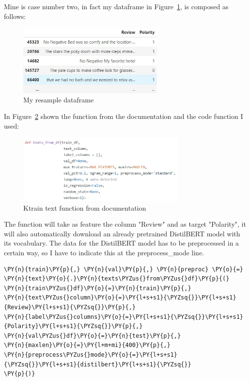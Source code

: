 Mine is case number two, in fact my dataframe in Figure~\ref{fig:fig_24}, is composed as follows:
\begin{figure}[ht!]
\centering
\includegraphics[width=0.65\textwidth]{images/dataframe.jpg}
\caption{My resample dataframe}
\label{fig:fig_24}
\end{figure}
\FloatBarrier

In Figure~\ref{fig:fig_22} shown the function from the documentation and the code function I used:
\begin{figure}[ht!]
\centering
\includegraphics[width=0.75\textwidth]{images/textdf.jpg}
\caption{\gls{Ktrain} text function from documentation}
\label{fig:fig_22}
\end{figure}
\FloatBarrier
The function will take as feature the column "Review" and as target "Polarity", it will also automatically download an already pretrained DistilBERT model with its vocabulary.
The data for the DistilBERT model has to be preprocessed in a certain way, so I have to indicate this at the preprocess\_mode line.
    \begin{tcolorbox}[breakable, size=fbox, boxrule=1pt, pad at break*=1mm,colback=cellbackground, colframe=cellborder]

\begin{Verbatim}[commandchars=\\\{\},fontsize=\footnotesize]
\PY{n}{train}\PY{p}{,} \PY{n}{val}\PY{p}{,} \PY{n}{preproc} \PY{o}{=} \PY{n}{text}\PY{o}{.}\PY{n}{texts\PYZus{}from\PYZus{}df}\PY{p}{(}
\PY{n}{train\PYZus{}df}\PY{o}{=}\PY{n}{train}\PY{p}{,}
\PY{n}{text\PYZus{}column}\PY{o}{=}\PY{l+s+s1}{\PYZsq{}}\PY{l+s+s1}{Review}\PY{l+s+s1}{\PYZsq{}}\PY{p}{,}
\PY{n}{label\PYZus{}columns}\PY{o}{=}\PY{l+s+s1}{\PYZsq{}}\PY{l+s+s1}{Polarity}\PY{l+s+s1}{\PYZsq{}}\PY{p}{,}
\PY{n}{val\PYZus{}df}\PY{o}{=}\PY{n}{test}\PY{p}{,}
\PY{n}{maxlen}\PY{o}{=}\PY{l+m+mi}{400}\PY{p}{,}
\PY{n}{preprocess\PYZus{}mode}\PY{o}{=}\PY{l+s+s1}{\PYZsq{}}\PY{l+s+s1}{distilbert}\PY{l+s+s1}{\PYZsq{}}
\PY{p}{)}
\end{Verbatim}
\end{tcolorbox}

